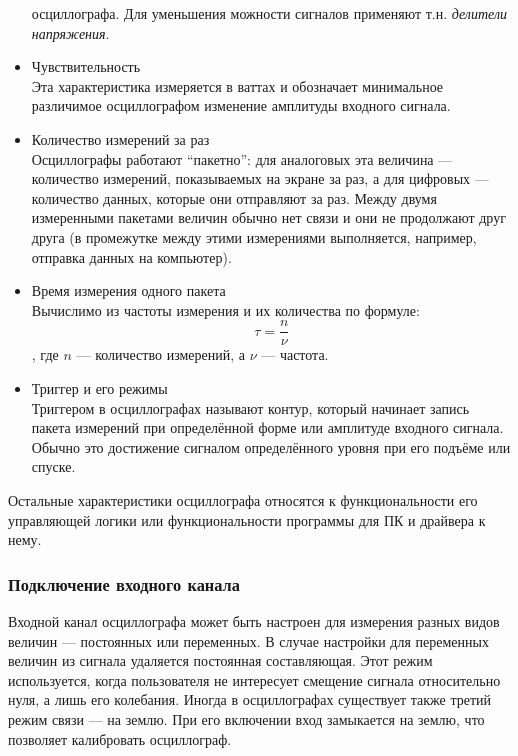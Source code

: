 \documentclass[a4paper,12pt]{report}
\numberwithin{equation}{section}
\begin{document}
\begin{itemize}
осциллографа. Для уменьшения можности сигналов применяют т.н. \textit{делители
  напряжения}.
\item Чувствительность \\
Эта характеристика измеряется в ваттах и обозначает минимальное различимое
осциллографом изменение амплитуды входного сигнала. \\
\item Количество измерений за раз \\
Осциллографы работают ``пакетно'': для аналоговых эта величина --- количество
измерений, показываемых на экране за раз, а для цифровых --- количество данных,
которые они отправляют за раз. Между двумя измеренными пакетами величин обычно
нет связи и они не продолжают друг друга (в промежутке между этими измерениями
выполняется, например, отправка данных на компьютер).
\item Время измерения одного пакета \\
Вычислимо из частоты измерения и их количества по формуле:
\begin{equation}
\tau = \frac{n}{\nu}
\end{equation}
, где $n$ --- количество измерений, а $\nu$ --- частота.
\item Триггер и его режимы \\
Триггером в осциллографах называют контур, который начинает запись пакета
измерений при определённой форме или амплитуде входного сигнала. Обычно это
достижение сигналом определённого уровня при его подъёме или спуске.
\end{itemize}
Остальные характеристики осциллографа относятся к функциональности его
управляющей логики или функциональности программы для ПК и драйвера к нему.

\subsubsection{Подключение входного канала}
Входной канал осциллографа может быть настроен для измерения разных видов
величин --- постоянных или переменных. В случае настройки для переменных величин
из сигнала удаляется постоянная составляющая. Этот режим используется, когда
пользователя не интересует смещение сигнала относительно нуля, а лишь его
колебания. Иногда в осциллографах существует также третий режим связи --- на
землю. При его включении вход замыкается на землю, что позволяет калибровать
осциллограф.
\end{document}
